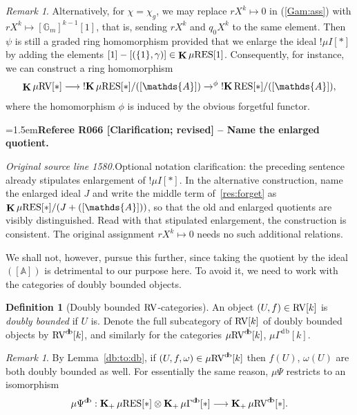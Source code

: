 \documentclass[12pt]{amsart}
\newcommand{\RefereeRemark}[4]{%
  \par\medskip\begingroup\normalfont\small\color{RefereePurple}%
  \emergencystretch=1.5em\noindent\textbf{Referee R#1 [#2] -- #3.}\par\nobreak\noindent #4\par
  \endgroup\medskip
}
\newcommand{\memph}[1]{{\color{magenta}\emph{#1}}}
\theoremstyle{plain}
\theoremstyle{definition}
\newtheorem{defn}[thm]{Definition}
\theoremstyle{remark}
\newtheorem{rem}[thm]{Remark}
\numberwithin{equation}{section}
\theoremstyle{plain}
\newcommand{\RV}{\textup{RV}}
\newcommand{\A}{\mathds{A}}
\newcommand{\G}{\mathds{G}}
\newcommand{\0}{\emptyset}
\newcommand{\fun}{\longrightarrow}
\newcommand{\efun}{\longmapsto}
\newcommand{\mgRV}{{\mu}{\RV}}
\newcommand{\mG}{{\mu}{\Gamma}}
\newcommand{\RES}{\textup{RES}}
\newcommand{\mgRES}{{\mu}{\RES}}
\DeclareMathOperator{\gsk}{\mathbf{K}_+}
\DeclareMathOperator{\ggk}{\mathbf{K}}
\DeclareMathOperator{\sggk}{!\mathbf{K}}
\DeclareMathOperator{\db}{d \! b}
\begin{document}
\begin{rem}
Alternatively, for $\chi = \chi_{g}$, we may replace $r X^k \efun 0$ in (\ref{Gam:ass}) with $r X^k \efun [\G_m]^{k-1}[1]$, that is, sending $r X^k$ and $q_0 X^k$ to the same element.  Then $\psi$ is still a graded ring homomorphism provided that we enlarge the ideal $!\mu I[*]$ by adding the elements $[1] - [(\{1\}, \gamma)] \in \ggk \mgRES[1]$. Consequently, for instance, we can construct a ring homomorphism
\begin{equation}\label{res:forget}
\ggk \mgRV[*] \fun \sggk \mgRES[*] / ([\A]) \to^{\phi} \sggk \RES[*] / ([\A]),
\end{equation}
where the homomorphism $\phi$ is induced by the obvious forgetful functor.

\RefereeRemark{066}{Clarification; revised}{Name the enlarged quotient}{%
\textit{Original source line 1580.}\quad Optional notation clarification: the preceding sentence already stipulates enlargement of $!\mu I[*]$. In the alternative construction, name the enlarged ideal $J$ and write the middle term of~\eqref{res:forget} as $\ggk\mgRES[*]/(J+([\A]))$, so that the old and enlarged quotients are visibly distinguished. Read with that stipulated enlargement, the construction is consistent. The original assignment $rX^k\mapsto0$ needs no such additional relations.
}

We shall not, however, pursue this further, since taking the quotient by the ideal $([\A])$ is detrimental to our purpose here. To avoid it, we need to work with the categories of doubly bounded objects.
\end{rem}

\begin{defn}[Doubly bounded $\RV$-categories]\label{db:RV}
An object $(U, f) \in \RV[k]$ is \memph{doubly bounded} if $U$ is. Denote the full subcategory of $\RV[k]$ of doubly bounded objects by $\RV^{\db}[k]$, and similarly for the categories $\mgRV^{\db}[k]$, $\mG^{\db}[k]$.
\end{defn}




\begin{rem}\label{tensor:bd}
By Lemma~\ref{db:to:db}, if $(U, f, \omega) \in \mgRV^{\db}[k]$ then $f(U)$, $\omega(U)$ are both doubly bounded as well. For essentially the same reason, ${\mu} \Psi$ restricts to an isomorphism
\[
{\mu} \Psi^{\db}: \gsk \mgRES[*] \otimes \gsk \mG^{\db}[*] \fun \gsk \mgRV^{\db}[*].
\]
\end{rem}
\end{document}
